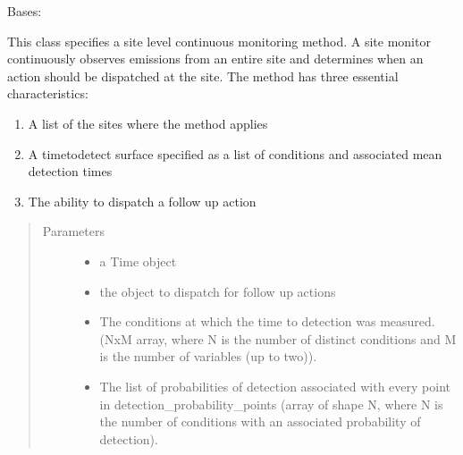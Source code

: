 \documentclass[letterpaper,10pt,english]{sphinxmanual}
\begin{document}
\begin{fulllineitems}
\label{\detokenize{index:feast.DetectionModules.site_monitor.SiteMonitor}}
Bases: {\hyperref[\detokenize{index:feast.DetectionModules.abstract_detection_method.DetectionMethod}]{}}

This class specifies a site level continuous monitoring method. A site monitor continuously observes
emissions from an entire site and determines when an action should be dispatched at the site.
The method has three essential characteristics:
\begin{enumerate}
%
\item {} 
A list of the sites where the method applies

\item {} 
A time\sphinxhyphen{}to\sphinxhyphen{}detect surface specified as a list of conditions and associated mean detection times

\item {} 
The ability to dispatch a follow up action

\end{enumerate}
\begin{quote}\begin{description}
\item[{Parameters}] \leavevmode\begin{itemize}
\item {} 
 \textendash{} a Time object

\item {} 
 \textendash{} the object to dispatch for follow up actions

\item {} 
 \textendash{} The conditions at which the time to detection was measured. (NxM array,
where N is the number of distinct conditions and M is the number of variables (up to two)).

\item {} 
 \textendash{} The list of probabilities of detection associated with every point in
detection\_probability\_points (array of shape N, where N is the number of conditions with an associated
probability of detection).


\end{itemize}
\end{description}
\end{quote}
\end{fulllineitems}
\end{document}
